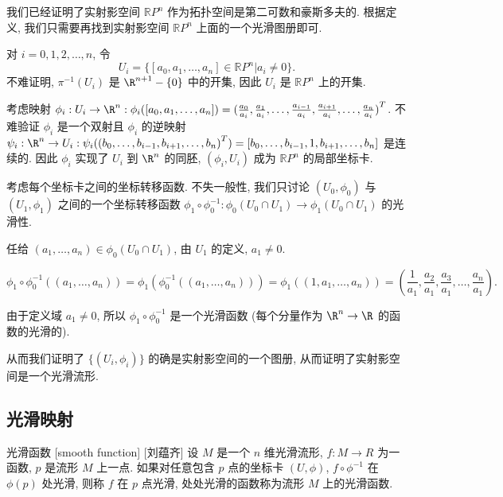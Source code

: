 \documentclass[UTF8]{ctexart}
\begin{document}
        \begin{prf}
            我们已经证明了实射影空间 \(\mathbb{R}P^n\) 作为拓扑空间是第二可数和豪斯多夫的. 根据定义, 我们只需要再找到实射影空间 \(\mathbb{R}P^n\) 上面的一个光滑图册即可. 

            对 \(i = 0,1,2,\dots,n\), 令
            \[
                U_i = \{[a_0, a_1, \dots, a_n] \in \mathbb{R}P^n | a_i \neq 0\}.
            \]
            不难证明,  \(\pi^{-1}(U_i)\)  是 \(\R^{n+1}-\{0\}\) 中的开集, 因此 \(U_i\) 是 \(\mathbb{R}P^n\) 上的开集. 

            考虑映射 \(\phi_i: U_i \to \R^n: \phi_i([a_0, a_1, \dots, a_n]) = {(\frac{a_0}{a_i},\frac{a_1}{a_i}, \dots, \frac{a_{i-1}}{a_i},\frac{a_{i+1}}{a_i},\dots, \frac{a_{n}}{a_i})}^{T}\). 不难验证 \(\phi_i\) 是一个双射且 \(\phi_i\) 的逆映射 \(\psi_i: \R^n \to U_i: \psi_i({(b_0, \dots,b_{i-1},b_{i+1},\dots, b_n)}^T) = [b_0, \dots,b_{i-1},1,b_{i+1},\dots, b_n]\) 是连续的. 因此 \(\phi_i\) 实现了 \(U_i\) 到 \(\R^n\) 的同胚, \((\phi_i,U_i)\) 成为 \(\mathbb{R}P^n\) 的局部坐标卡.  

            考虑每个坐标卡之间的坐标转移函数.  不失一般性, 我们只讨论 \((U_0, \phi_0)\) 与 \((U_1, \phi_1)\) 之间的一个坐标转移函数 \(\phi_1 \circ \phi_0^{-1}: \phi_0(U_0 \cap U_1) \to \phi_1(U_0 \cap U_1)\) 的光滑性. 

            任给 \((a_1,\dots,a_n) \in \phi_0(U_0 \cap U_1)\), 由 \(U_1\) 的定义,  \(a_1 \neq 0\). 

            \[
                \phi_1 \circ \phi_0^{-1}((a_1,\dots,a_n)) = \phi_1(\phi_0^{-1}((a_1,\dots,a_n))) = \phi_1((1, a_1,\dots,a_n))
                = (\frac{1}{a_1}, \frac{a_2}{a_1},\frac{a_3}{a_1}, \dots, \frac{a_n}{a_1}).
            \]

            由于定义域 \(a_1 \neq 0\), 所以 \(\phi_1 \circ \phi_0^{-1}\) 是一个光滑函数 (每个分量作为 \(\R^n \to \R\) 的函数的光滑的). 

            从而我们证明了 \(\{(U_i,\phi_i)\}\) 的确是实射影空间的一个图册, 从而证明了实射影空间是一个光滑流形. 
        \end{prf}
    
    \subsection{光滑映射}
    
        \begin{dfn}
            []
            {光滑函数}
            [smooth function]
            [刘蕴齐]
            设 \(M\) 是一个 \(n\) 维光滑流形,  \(f: M \to R \)  为一函数, \(p\) 是流形 \(M\) 上一点. 
            如果对任意包含 \(p\) 点的坐标卡 \((U,\phi)\),
             \(f \circ \phi^{-1}\) 在 \(\phi(p)\) 处光滑, 
            则称 \(f\) 在 \(p\) 点光滑,
            处处光滑的函数称为流形 \(M\) 上的光滑函数. 
        \end{dfn}
\end{document}
